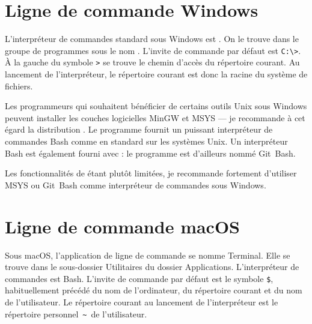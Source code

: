 \section{Ligne de commande Windows}
\label{sec:cli:windows}

L'interpréteur de commandes standard sous Windows est
. On le trouve dans le groupe
de programmes  sous le nom . L'invite de commande par défaut est \verb=C:\>=. À la
gauche du symbole \verb=>= se trouve le chemin d'accès du répertoire
courant. Au lancement de l'interpréteur, le répertoire courant est
donc la racine du système de fichiers.

Les programmeurs qui souhaitent bénéficier de certains outils
Unix sous Windows peuvent installer les couches
logicielles MinGW et MSYS --- je recommande à
cet égard la distribution
. Le programme
 fournit un puissant interpréteur de commandes
Bash \citep{bash} comme en standard sur les systèmes Unix.
Un interpréteur Bash est également fourni avec 
: le programme
est d'ailleurs nommé Git~Bash.

Les fonctionnalités de  étant plutôt limitées, je
recommande fortement d'utiliser MSYS ou Git~Bash comme interpréteur de
commandes sous Windows.



\section{Ligne de commande macOS}
\label{sec:cli:macos}

Sous macOS, l'application de ligne de commande se nomme
Terminal. Elle se trouve dans le sous-dossier
Utilitaires du dossier Applications. L'interpréteur de commandes est
Bash. L'invite de commande par défaut est le symbole
\verb=$=, habituellement précédé du nom de l'ordinateur, du répertoire
courant et du nom de l'utilisateur. Le répertoire courant au lancement
de l'interpréteur est le répertoire personnel \,\verb=~=\, de
l'utilisateur.



